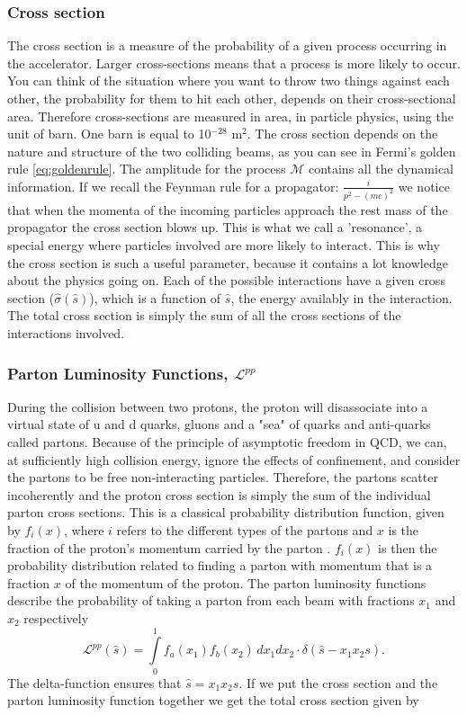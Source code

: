 \subsubsection{Cross section}
The cross section is a measure of the probability of a given process occurring in the accelerator. Larger cross-sections means that a process is more likely to occur. You can think of the situation where you want to throw two things against each other, the probability for them to hit each other, depends on their cross-sectional area. Therefore cross-sections are measured in area, in particle physics, using the unit of barn. One barn is equal to 10$^{-28}$ m$^{2}$.
The cross section depends on the nature and structure of the two colliding beams, as you can see in Fermi's golden rule \eqref{eq:goldenrule}. The amplitude for the process $\mathcal{M}$ contains all the dynamical information. If we recall the Feynman rule for a propagator: $\frac{i}{p^{2}-(mc)^{2}}$ we notice that when the momenta of the incoming particles approach the rest mass of the propagator the cross section blows up. This is what we call a 'resonance', a special energy where particles involved are more likely to interact. This is why the cross section is such a useful parameter, because it contains a lot knowledge about the physics going on. Each of the possible interactions have a given cross section ($\hat \sigma(\hat s)$), which is a function of $\hat s$, the energy availably in the interaction. The total cross section is simply the sum of all the cross sections of the interactions involved\cite{griffiths1987iep}.

\subsubsection{Parton Luminosity Functions, $\mathcal{L}^{pp}$}
During the collision between two protons, the proton will disassociate into a virtual state of u and d quarks, gluons and a "sea" of quarks and anti-quarks called partons. Because of the principle of asymptotic freedom in QCD, we can, at sufficiently high collision energy, ignore the effects of confinement, and consider the partons to be free non-interacting particles. Therefore, the partons scatter incoherently and the proton cross section is simply the sum of the individual parton cross sections. This is a classical probability distribution function, given by $f_{i}(x)$, where $i$ refers to the different types of the partons and $x$ is the fraction of the proton's momentum carried by the parton \cite{green2005hpp}. $f_{i}(x)$ is then the probability distribution related to finding a parton with momentum that is a fraction $x$ of the momentum of the proton. The parton luminosity functions describe the probability of taking a parton from each beam with fractions $x_{1}$ and $x_{2}$ respectively
\begin{equation}
\mathcal{L}^{pp}(\hat s)=\int\limits_{0}^{1} f_{a}(x_{1}) f_{b}(x_{2})\, dx_{1}dx_{2}\cdot \delta(\hat s - x_{1}x_{2}s).
\end{equation}
The delta-function ensures that $\hat s = x_{1}x_{2}s$. If we put the cross section and the parton luminosity function together we get the total cross section given by

